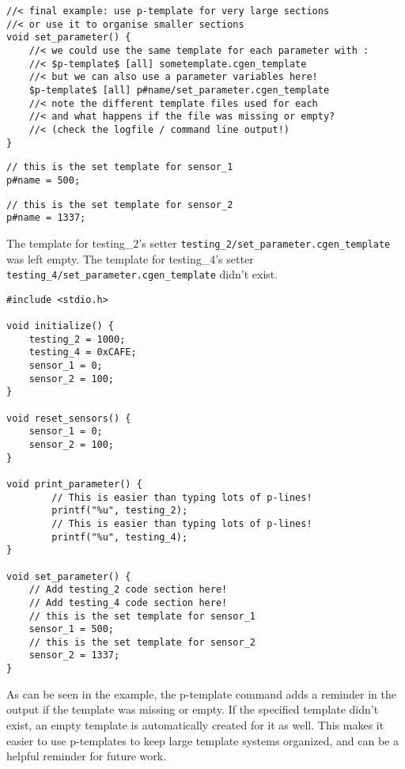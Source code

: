 \documentclass{settings/TU_Delft_Report}
\begin{document}
\begin{appendices}
\begin{lstlisting}[caption={parameter commands example}, language = {}]
//< final example: use p-template for very large sections
//< or use it to organise smaller sections
void set_parameter() {
	//< we could use the same template for each parameter with :
	//< $p-template$ [all] sometemplate.cgen_template
	//< but we can also use a parameter variables here!
	$p-template$ [all] p#name/set_parameter.cgen_template
	//< note the different template files used for each
	//< and what happens if the file was missing or empty?
	//< (check the logfile / command line output!)
}
\end{lstlisting}

\begin{lstlisting}[caption={parameter commands example}, language = {}]
// this is the set template for sensor_1
p#name = 500;
\end{lstlisting}

\begin{lstlisting}[caption={parameter commands example}, language = {}]
// this is the set template for sensor_2
p#name = 1337;
\end{lstlisting}

\noindent The template for testing\_2's setter \lstinline{testing_2/set_parameter.cgen_template} was left empty. The template for testing\_4's setter \lstinline{testing_4/set_parameter.cgen_template} didn't exist.

\begin{lstlisting}[caption={result}, language = {}]
#include <stdio.h>

void initialize() {
	testing_2 = 1000;
	testing_4 = 0xCAFE;
	sensor_1 = 0;
	sensor_2 = 100;
}

void reset_sensors() {
	sensor_1 = 0;
	sensor_2 = 100;
}

void print_parameter() {
		// This is easier than typing lots of p-lines!
		printf("%u", testing_2);
		// This is easier than typing lots of p-lines!
		printf("%u", testing_4);
}

void set_parameter() {
	// Add testing_2 code section here!
	// Add testing_4 code section here!
	// this is the set template for sensor_1
	sensor_1 = 500;
	// this is the set template for sensor_2
	sensor_2 = 1337;
}

\end{lstlisting}

\noindent As can be seen in the example, the p-template command adds a reminder in the output if the template was missing or empty. If the specified template didn't exist, an empty template is automatically created for it as well. This makes it easier to use p-templates to keep large template systems organized, and can be a helpful reminder for future work.

\end{appendices}

\printbibliography
\end{document}
